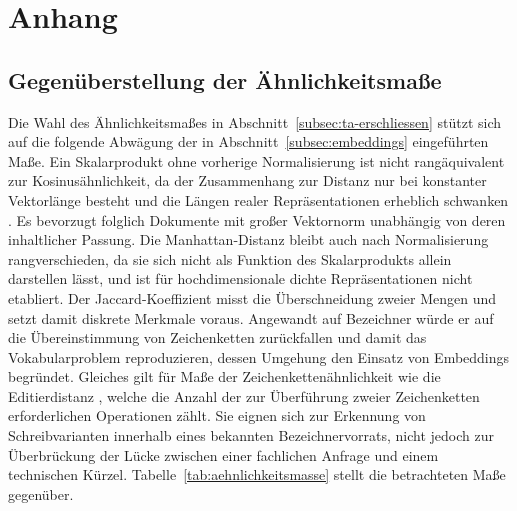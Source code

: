 \chapter{Anhang}

\section{Gegenüberstellung der Ähnlichkeitsmaße}
\label{Anhang_Aehnlichkeit}

Die Wahl des Ähnlichkeitsmaßes in Abschnitt~\ref{subsec:ta-erschliessen} stützt sich auf die folgende Abwägung der in Abschnitt~\ref{subsec:embeddings} eingeführten Maße. Ein Skalarprodukt ohne vorherige Normalisierung ist nicht rangäquivalent zur Kosinusähnlichkeit, da der Zusammenhang zur Distanz nur bei konstanter Vektorlänge besteht und die Längen realer Repräsentationen erheblich schwanken \cite{shrivastava_asymmetric_2014}. Es bevorzugt folglich Dokumente mit großer Vektornorm unabhängig von deren inhaltlicher Passung. Die Manhattan-Distanz bleibt auch nach Normalisierung rangverschieden, da sie sich nicht als Funktion des Skalarprodukts allein darstellen lässt, und ist für hochdimensionale dichte Repräsentationen nicht etabliert. Der Jaccard-Koeffizient misst die Überschneidung zweier Mengen \cite{manning_introduction_2008} und setzt damit diskrete Merkmale voraus. Angewandt auf Bezeichner würde er auf die Übereinstimmung von Zeichenketten zurückfallen und damit das Vokabularproblem reproduzieren, dessen Umgehung den Einsatz von Embeddings begründet. Gleiches gilt für Maße der Zeichenkettenähnlichkeit wie die Editierdistanz \cite{manning_introduction_2008}, welche die Anzahl der zur Überführung zweier Zeichenketten erforderlichen Operationen zählt. Sie eignen sich zur Erkennung von Schreibvarianten innerhalb eines bekannten Bezeichnervorrats, nicht jedoch zur Überbrückung der Lücke zwischen einer fachlichen Anfrage und einem technischen Kürzel. Tabelle~\ref{tab:aehnlichkeitsmasse} stellt die betrachteten Maße gegenüber.

